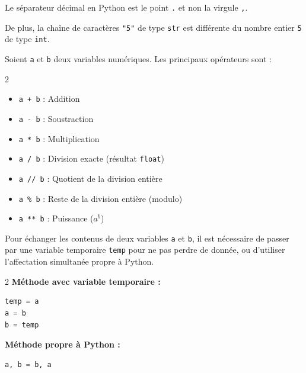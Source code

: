 \begin{attention}
	Le séparateur décimal en Python est le point \lstinline|.| et non la virgule \lstinline|,|.

	De plus, la chaîne de caractères \lstinline|"5"| de type \lstinline|str| est différente du nombre entier \lstinline|5| de type \lstinline|int|.
\end{attention}

\begin{prop}
	Soient \lstinline|a| et \lstinline|b| deux variables numériques. Les principaux opérateurs sont :
	\begin{multicols}{2}
		\begin{itemize}
			\item \lstinline|a + b| : Addition
			\item \lstinline|a - b| : Soustraction
			\item \lstinline|a * b| : Multiplication
			\item \lstinline|a / b| : Division exacte (résultat \lstinline|float|)
			\item \lstinline|a // b| : Quotient de la division entière
			\item \lstinline|a % b| : Reste de la division entière (modulo)
			\item \lstinline|a ** b| : Puissance ($a^b$)
		\end{itemize}
	\end{multicols}
\end{prop}

\newpage

\begin{methode}
	Pour échanger les contenus de deux variables \lstinline|a| et \lstinline|b|, il est nécessaire de passer par une variable temporaire \lstinline|temp| pour ne pas perdre de donnée, ou d'utiliser l'affectation simultanée propre à Python.

	\begin{correction}
		\nline
		{
			\setlength{\columnseprule}{0.6pt}
			\begin{multicols}{2}
				\noindent\textbf{Méthode avec variable temporaire :}
				\begin{lstlisting}[language=Python]
temp = a
a = b
b = temp
\end{lstlisting}
				\columnbreak
				\noindent\textbf{Méthode propre à Python :}
				\begin{lstlisting}[language=Python]
a, b = b, a
	
	
\end{lstlisting}
			\end{multicols}
		}
	\end{correction}
\end{methode}

